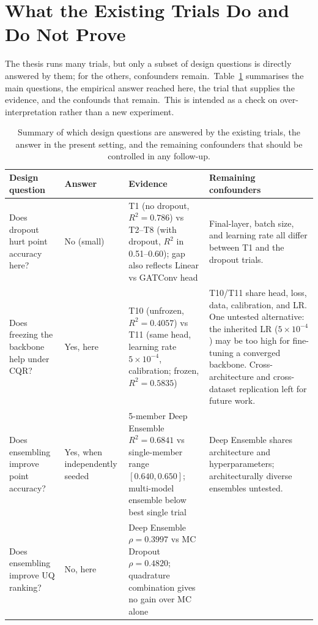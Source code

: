 \section{What the Existing Trials Do and Do Not Prove}\label{sec:ablation_summary}

The thesis runs many trials, but only a subset of design questions is directly answered by them; for the others, confounders remain.\ Table~\ref{tab:ablation_summary} summarises the main questions, the empirical answer reached here, the trial that supplies the evidence, and the confounds that remain.\ This is intended as a check on over-interpretation rather than a new experiment.

\begin{table}[htbp]
\centering
\caption[Ablation summary: what the trials do and do not prove]{Summary of which design questions are answered by the existing trials, the answer in the present setting, and the remaining confounders that should be controlled in any follow-up.}
\label{tab:ablation_summary}
\footnotesize
\setlength{\tabcolsep}{4pt}
\renewcommand{\arraystretch}{1.15}
\begin{tabular}{p{3.6cm}p{2.0cm}p{4.2cm}p{3.7cm}}
\toprule
\textbf{Design question} & \textbf{Answer} & \textbf{Evidence} & \textbf{Remaining confounders} \\
\midrule
Does dropout hurt point accuracy here? &
No (small) &
T1 (no dropout, $R^2 = 0.786$) vs T2--T8 (with dropout, $R^2$ in 0.51--0.60); gap also reflects Linear vs GATConv head &
Final-layer, batch size, and learning rate all differ between T1 and the dropout trials. \\
\midrule
Does freezing the backbone help under CQR? &
Yes, here &
T10 (unfrozen, $R^2 = 0.4057$) vs T11 (same head, learning rate $5\times10^{-4}$, calibration; frozen, $R^2 = 0.5835$) &
T10/T11 share head, loss, data, calibration, and LR. One untested alternative: the inherited LR ($5\times10^{-4}$) may be too high for fine-tuning a converged backbone. Cross-architecture and cross-dataset replication left for future work. \\
\midrule
Does ensembling improve point accuracy? &
Yes, when independently seeded &
5-member Deep Ensemble $R^2 = 0.6841$ vs single-member range $[0.640, 0.650]$; multi-model ensemble below best single trial &
Deep Ensemble shares architecture and hyperparameters; architecturally diverse ensembles untested. \\
\midrule
Does ensembling improve UQ ranking? &
No, here &
Deep Ensemble $\rho = 0.3997$ vs MC Dropout $\rho = 0.4820$; quadrature combination gives no gain over MC alone &

\end{tabular}
\end{table}
